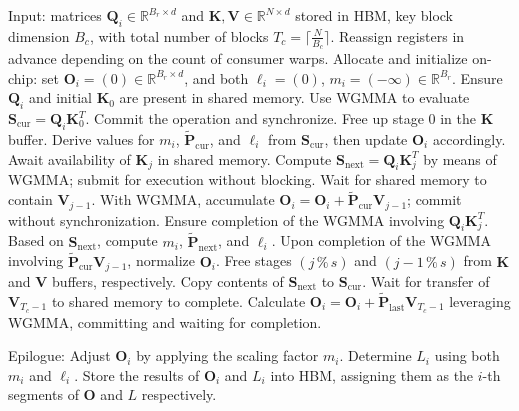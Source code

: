 \begin{algorithm}[H]
    \caption{\small\label{alg:flash3_wgmma}\textsc{FlashAttention-3} Consumer Warpgroup: Forward Pass Procedure}
    \begin{algorithmic}[1]
      \REQUIRE  Input: matrices $\mathbf{Q}_i \in \mathbb{R}^{B_r \times d}$ and $\mathbf{K}, \mathbf{V} \in \mathbb{R}^{N \times d}$ stored in HBM, key block dimension $B_c$, with total number of blocks $T_c = \lceil \frac{N}{B_c} \rceil$.
      \STATE Reassign registers in advance depending on the count of consumer warps.
      \STATE Allocate and initialize on-chip: set $\mathbf{O}_i = (0) \in \mathbb{R}^{B_r \times d}$, and both $\ell_i = (0)$, $m_i = (-\infty) \in \mathbb{R}^{B_r}$.
      \STATE Ensure $\mathbf{Q}_i$ and initial $\mathbf{K}_0$ are present in shared memory.
      \STATE Use WGMMA to evaluate $\mathbf{S}_{\mathrm{cur}} = \mathbf{Q}_i \mathbf{K}_0^T$. Commit the operation and synchronize.
      \STATE Free up stage $0$ in the $\mathbf{K}$ buffer.
      \STATE Derive values for $m_{i}$, $\tilde{\mathbf{P}}_{\mathrm{cur}}$, and $\ell_{i}$ from $\mathbf{S}_{\mathrm{cur}}$, then update $\mathbf{O}_i$ accordingly.
        \STATE Await availability of $\mathbf{K}_j$ in shared memory.
        \label{code:mainloop_start}
        \STATE Compute $\mathbf{S}_{\mathrm{next}} = \mathbf{Q}_i \mathbf{K}_{j}^T$ by means of WGMMA; submit for execution without blocking. \label{code:first_wgmma}
        \STATE Wait for shared memory to contain $\mathbf{V}_{j-1}$.
        \STATE With WGMMA, accumulate $\mathbf{O}_{i} = \mathbf{O}_{i} + \tilde{\mathbf{P}}_{\mathrm{cur}} \mathbf{V}_{j-1}$; commit without synchronization. \label{code:second_wgmma}
        \STATE Ensure completion of the WGMMA involving $\mathbf{Q}_i \mathbf{K}_{j}^T$.
        \STATE Based on $\mathbf{S}_{\mathrm{next}}$, compute $m_{i}$, $\tilde{\mathbf{P}}_{\mathrm{next}}$, and $\ell_{i}$. \label{code:softmax}
        \STATE Upon completion of the WGMMA involving $\tilde{\mathbf{P}}_{\mathrm{cur}} \mathbf{V}_{j-1}$, normalize $\mathbf{O}_i$.
        \STATE Free stages $(j\,\%\,s)$ and $(j-1\,\%\,s)$ from $\mathbf{K}$ and $\mathbf{V}$ buffers, respectively.
        \STATE Copy contents of $\mathbf{S}_{\mathrm{next}}$ to $\mathbf{S}_{\mathrm{cur}}$.
        \label{code:mainloop_end}
      \ENDFOR \STATE Wait for transfer of $\mathbf{V}_{T_c - 1}$ to shared memory to complete.
      \STATE Calculate
      $\mathbf{O}_{i} = \mathbf{O}_{i} + \tilde{\mathbf{P}}_{\mathrm{last}} \mathbf{V}_{T_c - 1}$ leveraging WGMMA, committing and waiting for completion.

\STATE Epilogue: Adjust $\mathbf{O}_{i}$ by applying the scaling factor $m_{i}$. Determine $L_{i}$ using both $m_{i}$ and $\ell_{i}$.  
      Store the results of $\mathbf{O}_{i}$ and $L_{i}$ into HBM, assigning them as the $i$-th segments of $\mathbf{O}$ and $L$ respectively.  
    \end{algorithmic}
  \end{algorithm}

